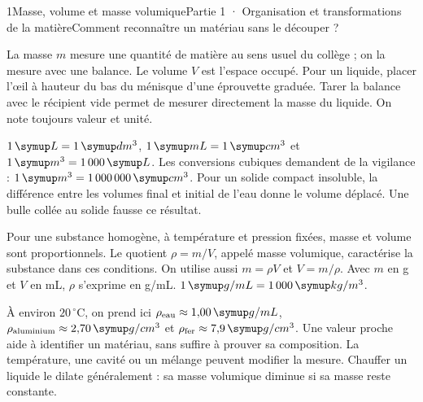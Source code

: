 \begin{ouverture}[college1]{1}{Masse, volume et masse volumique}{Partie 1 · Organisation et transformations de la matière}{Comment reconnaître un matériau sans le découper ?}
\end{ouverture}
\label{ess-1}
La masse $m$ mesure une quantité de matière au sens usuel du collège ; on la mesure avec une balance. Le volume $V$ est l’espace occupé. Pour un liquide, placer l’œil à hauteur du bas du ménisque d’une éprouvette graduée. Tarer la balance avec le récipient vide permet de mesurer directement la masse du liquide. On note toujours valeur et unité.\par
{}
$1\unite{L}=1\unite{dm^3}$, $1\unite{mL}=1\unite{cm^3}$ et $1\unite{m^3}=1\,000\unite{L}$. Les conversions cubiques demandent de la vigilance : $1\unite{m^3}=1\,000\,000\unite{cm^3}$. Pour un solide compact insoluble, la différence entre les volumes final et initial de l’eau donne le volume déplacé. Une bulle collée au solide fausse ce résultat.\par
\clearpage
{}
Pour une substance homogène, à température et pression fixées, masse et volume sont proportionnels. Le quotient $\rho=m/V$, appelé masse volumique, caractérise la substance dans ces conditions. On utilise aussi $m=\rho V$ et $V=m/\rho$. Avec $m$ en g et $V$ en mL, $\rho$ s’exprime en g/mL. $1\unite{g/mL}=1\,000\unite{kg/m^3}$.\par
{}
À environ $20\,^{\circ}\mathrm C$, on prend ici $\rho_{\text{eau}}\approx1{,}00\unite{g/mL}$, $\rho_{\text{aluminium}}\approx2{,}70\unite{g/cm^3}$ et $\rho_{\text{fer}}\approx7{,}9\unite{g/cm^3}$. Une valeur proche aide à identifier un matériau, sans suffire à prouver sa composition. La température, une cavité ou un mélange peuvent modifier la mesure. Chauffer un liquide le dilate généralement : sa masse volumique diminue si sa masse reste constante.\par
